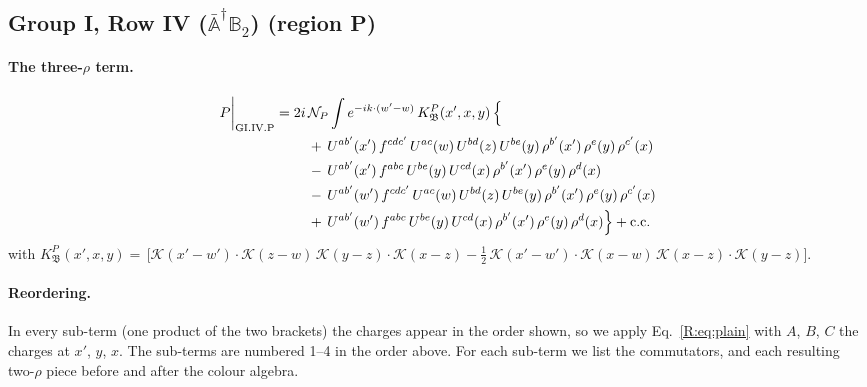 \documentclass[10pt]{article}
\numberwithin{equation}{section}
\newcommand{\KK}{\mathcal K}
\newcommand{\NP}{\mathcal N_{P}}
\begin{document}
\subsection{Group I, Row IV ($\bar{\mathbb A}^\dagger\mathbb B_2$) (region P)}\label{B:sec:GI.IV.P}

\paragraph{The three-$\rho$ term.}
\begin{align}
P\bigg|_{\rm GI.IV.P}={}&2i\,\NP\int e^{-ik\cdot(w'-w)}\,K^{P}_{\mathfrak B}(x',x,y)\,\Big\{\notag\\
&\quad +\,U^{ab'}(x')\,f^{cdc'}\,U^{ac}(w)\,U^{bd}(z)\,U^{be}(y)\,\rho^{b'}(x')\,\rho^{e}(y)\,\rho^{c'}(x)\notag\\
&\quad -\,U^{ab'}(x')\,f^{abc}\,U^{be}(y)\,U^{cd}(x)\,\rho^{b'}(x')\,\rho^{e}(y)\,\rho^{d}(x)\notag\\
&\quad -\,U^{ab'}(w')\,f^{cdc'}\,U^{ac}(w)\,U^{bd}(z)\,U^{be}(y)\,\rho^{b'}(x')\,\rho^{e}(y)\,\rho^{c'}(x)\notag\\
&\quad +\,U^{ab'}(w')\,f^{abc}\,U^{be}(y)\,U^{cd}(x)\,\rho^{b'}(x')\,\rho^{e}(y)\,\rho^{d}(x)\Big\}+{\rm c.c.}\label{B:eq:in-GI.IV.P}
\end{align}
with $K^{P}_{\mathfrak B}(x',x,y)=\,\Big[\KK(x'-w')\cdot\KK(z-w)\,\KK(y-z)\cdot\KK(x-z)-\frac{1}{2}\,\KK(x'-w')\cdot\KK(x-w)\,\KK(x-z)\cdot\KK(y-z)\Big]$.
\paragraph{Reordering.} In every sub-term (one product of the two brackets) the charges appear in the order shown, so we apply Eq.~\eqref{R:eq:plain} with $A$, $B$, $C$ the charges at $x'$, $y$, $x$. The sub-terms are numbered 1--4 in the order above. For each sub-term we list the commutators, and each resulting two-$\rho$ piece before and after the colour algebra.
\end{document}

